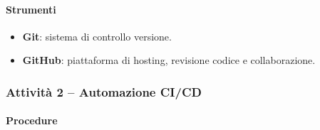 \documentclass[a4paper, 11pt, oneside]{scrartcl}
\begin{document}
\paragraph{Strumenti}
\begin{itemize}
    \item \textbf{Git}: sistema di controllo versione.
    \item \textbf{GitHub}: piattaforma di hosting, revisione codice e collaborazione.
\end{itemize}

\subsubsection{Attività 2 – Automazione CI/CD}

\paragraph{Procedure}
\end{document}
